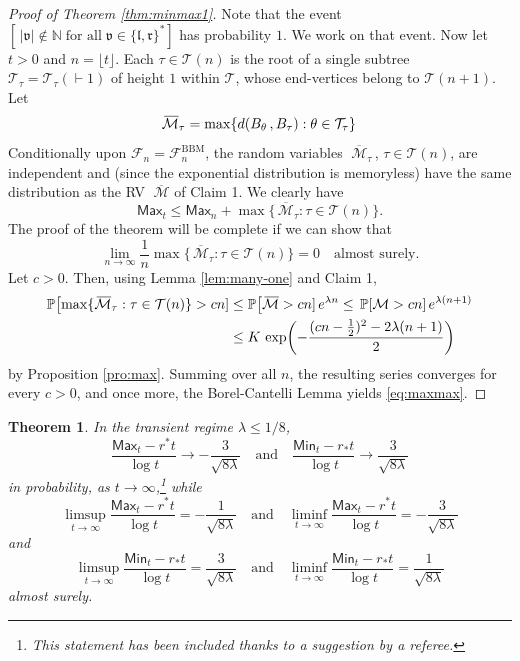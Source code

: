 \documentclass[12pt]{amsart}
\newcommand\AND{\quad\text{and}\quad}
\newcommand\BB{\textit{\textbf{B}}}
\newcommand\F{\mathcal F}
\newcommand\lt{\mathfrak{l}}
\newcommand\N{\mathbb N}
\newcommand\Prob{\mathbb P}
\newcommand\ro{d}
\newcommand\rt{\mathfrak{r}}
\newcommand\T{\mathcal T}
\newcommand\vt{\mathfrak{v}}
\newtheorem{theorem}{Theorem}%
\numberwithin{theorem}{section}
\theoremstyle{definition}
\begin{document}
\begin{proof}[Proof of Theorem \ref{thm:minmax1}]
Note that the event $[\,|\vt| \notin \N \;\text{for all}\; \vt \in \{\lt,\rt\}^*]$ has
probability $1$. We work on that event.
Now let $t > 0$ and $n = \lfloor t \rfloor$. 
Each $\tau \in \T(n)$ is the root of a single subtree $\T_{\tau} = \T_{\tau}(\vdash\! 1)$ 
of height $1$ within $\T$, whose end-vertices belong to $\T(n+1)$. Let 
$$
\overline{\!\mathcal{M}}_{\tau} = \max \{ \ro(\BB_{\theta}\,,\BB_{\tau}) : \theta \in \T_{\tau}\}
$$
Conditionally upon $\F_n = \F_n^{\text{BBM}}$, 
the random variables $\;\overline{\!\mathcal{M}}_{\tau}\,$, $\tau \in \T(n)$, are 
independent and (since the exponential distribution is memoryless) have the same 
distribution as the RV $\;\overline{\!\mathcal{M}}$ of Claim 1.
We clearly have 
$$
\mathsf{Max}_t \le \mathsf{Max}_n + \max \{ \,\overline{\!\mathcal{M}}_{\tau} : \tau \in \T(n) \}.
$$
The proof of the theorem will be complete if we can show that 
\begin{equation}\label{eq:maxmax}
\lim_{n \to \infty} \frac{1}{n} \max \{ \,\overline{\!\mathcal{M}}_{\tau} : \tau \in \T(n) \} = 0
\quad \text{almost surely.}
\end{equation}
Let $c > 0$. Then, using Lemma \ref{lem:many-one} and Claim 1,
$$
\begin{aligned}
\Prob\bigl[\max \{ \,\overline{\!\mathcal{M}}_{\tau} : \tau \in \T(n) \} > cn]
&\le \Prob\bigl[\,\overline{\!\mathcal{M}} > cn]\, e^{\lambda n}
\le \, \Prob[\mathcal{M} >cn]\,e^{\lambda(n+1)}\\
&\le \textsl{K}\, 
\exp\biggl( -\frac{(cn-\tfrac{1}{2})^2- 2\lambda(n+1)}{2}\biggr)\,
\end{aligned}
$$
by Proposition \ref{pro:max}.
Summing over all $n$, the resulting series converges for every $c> 0$, and once more, 
the Borel-Cantelli Lemma yields \eqref{eq:maxmax}.
\end{proof}

\begin{theorem}\label{thm:minmax2} In the transient regime $\lambda \le 1/8$,
$$
\frac{\mathsf{Max}_t - r^*t}{\log t} \to - \frac{3}{\sqrt{8\lambda}} \AND 
\frac{\mathsf{Min}_t - r_*t}{\log t} \to  \frac{3}{\sqrt{8\lambda}} 
$$
in probability, 
as $t \to \infty$,\footnote{This statement has been included thanks to a suggestion by a referee.} while 
$$
\limsup_{t \to \infty} \frac{\mathsf{Max}_t - r^*t}{\log t} = - \frac{1}{\sqrt{8\lambda}}
\AND 
\liminf_{t \to \infty} \frac{\mathsf{Max}_t - r^*t}{\log t} = - \frac{3}{\sqrt{8\lambda}}
$$
and 
$$
\limsup_{t \to \infty} \frac{\mathsf{Min}_t - r_*t}{\log t} =  \frac{3}{\sqrt{8\lambda}}
\AND 
\liminf_{t \to \infty} \frac{\mathsf{Min}_t - r_*t}{\log t} =  \frac{1}{\sqrt{8\lambda}}
$$
almost surely.
\end{theorem}
\end{document}
